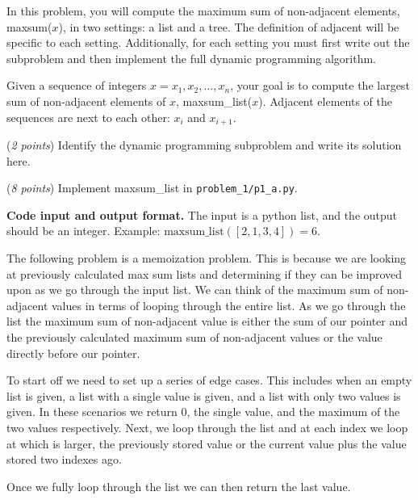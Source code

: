 \documentclass{hw}
\newcommand{\io}{\textbf{Code input and output format.} }
\begin{document}

\begin{problem}
In this problem, you will compute the maximum sum of non-adjacent elements,
maxsum($x$), in two settings:
a list and a tree.
The definition of adjacent will be specific to each setting.
Additionally, for each setting you must first write out the subproblem
and then implement the full dynamic programming algorithm.

\begin{subproblem}
Given a sequence of integers $ x = x_1,x_2,\ldots,x_n $,
your goal is to compute the largest sum of non-adjacent elements of $x$,
maxsum\_list($x$).
Adjacent elements of the sequences are next to each other: $x_i$ and $x_{i+1}$.

(\textit{2 points}) Identify the dynamic programming subproblem and write its solution here.

(\textit{8 points}) Implement maxsum\_list in \texttt{problem\_1/p1\_a.py}.
\end{subproblem}

\io The input is a python list, and the output should be an integer.
Example: $\text{maxsum\_list}([2,1,3,4]) = 6$.

\begin{solution}
The following problem is a memoization problem. This is because we are looking at previously calculated max sum lists and determining if they can be improved upon as we go through the input list. We can think of the maximum sum of non-adjacent values in terms of looping through the entire list. As we go through the list the maximum sum of non-adjacent value is either the sum of our pointer and the previously calculated maximum sum of non-adjacent values or the value directly before our pointer. 

To start off we need to set up a series of edge cases. This includes when an empty list is given, a list with a single value is given, and a list with only two values is given. In these scenarios we return 0, the single value, and the maximum of the two values respectively. Next, we loop through the list and at each index we loop at which is larger, the previously stored value or the current value plus the value stored two indexes ago.

Once we fully loop through the list we can then return the last value.


\end{solution}


\end{problem}
\end{document}
